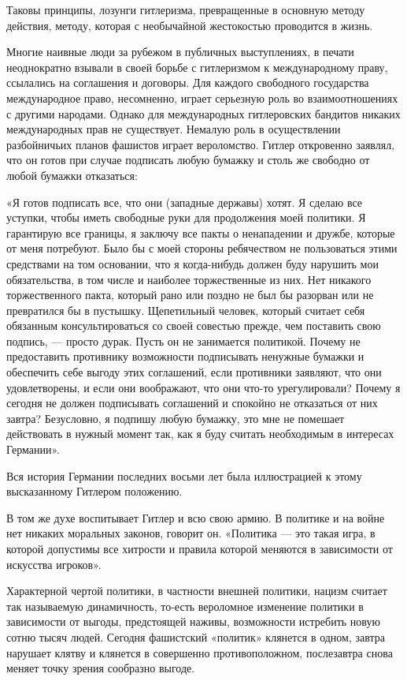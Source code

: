 \documentclass[12pt, a4paper, openany]{book}
\begin{document}
Таковы принципы, лозунги гитлеризма, превращенные в основную методу действия, методу, которая с необычайной жестокостью проводится в жизнь.

Многие наивные люди за рубежом в публичных выступлениях, в печати неоднократно взывали в своей борьбе с гитлеризмом к международному праву, ссылались на соглашения и договоры. Для каждого свободного государства международное право, несомненно, играет серьезную роль во взаимоотношениях с другими народами. Однако для международных гитлеровских бандитов никаких международных прав не существует. Немалую роль в осуществлении разбойничьих планов фашистов играет вероломство. Гитлер откровенно заявлял, что он готов при случае подписать любую бумажку и столь же свободно от любой бумажки отказаться:

«Я готов подписать все, что они (западные державы) хотят. Я сделаю все уступки, чтобы иметь свободные руки для продолжения моей политики. Я гарантирую все границы, я заключу все пакты о ненападении и дружбе, которые от меня потребуют. Было бы с моей стороны ребячеством не пользоваться этими средствами на том основании, что я когда-нибудь должен буду нарушить мои обязательства, в том числе и наиболее торжественные из них. Нет никакого торжественного пакта, который рано или поздно не был бы разорван или не превратился бы в пустышку. Щепетильный человек, который считает себя обязанным консультироваться со своей совестью прежде, чем поставить свою подпись, — просто дурак. Пусть он не занимается политикой. Почему не предоставить противнику возможности подписывать ненужные бумажки и обеспечить себе выгоду этих соглашений, если противники заявляют, что они удовлетворены, и если они воображают, что они что-то урегулировали? Почему я сегодня не должен подписывать соглашений и спокойно не отказаться от них завтра? Безусловно, я подпишу любую бумажку, это мне не помешает действовать в нужный момент так, как я буду считать необходимым в интересах Германии».

Вся история Германии последних восьми лет была иллюстрацией к этому высказанному Гитлером положению.

В том же духе воспитывает Гитлер и всю свою армию. В политике и на войне нет никаких моральных законов, говорит он. «Политика — это такая игра, в которой допустимы все хитрости и правила которой меняются в зависимости от искусства игроков».

Характерной чертой политики, в частности внешней политики, нацизм считает так называемую динамичность, то-есть вероломное изменение политики в зависимости от выгоды, предстоящей наживы, возможности истребить новую сотню тысяч людей. Сегодня фашистский «политик» клянется в одном, завтра нарушает клятву и клянется в совершенно противоположном, послезавтра снова меняет точку зрения сообразно выгоде.
\end{document}
